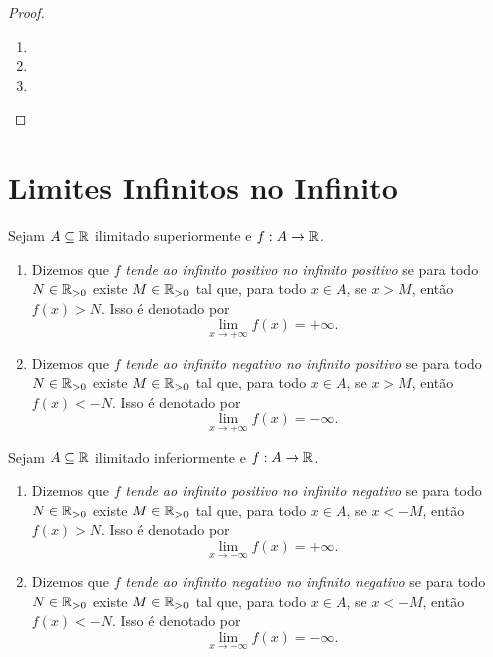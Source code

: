 \begin{proof}
    \leavevmode
        \begin{enumerate}[leftmargin=*, align=left, label=\textbf{(\alph*)}]
            \item \blackproof
            \item \blackproof
            \item \blackproof
        \end{enumerate}
\end{proof}

\section{Limites Infinitos no Infinito}

\begin{definition}
    Sejam $A \subseteq \mathbb{R}$ ilimitado superiormente e $f: A \to \mathbb{R}$.
        \begin{enumerate}[leftmargin=*, align=left, label=\textbf{(\alph*)}]
            \item Dizemos que $f$ \emph{tende ao infinito positivo no infinito positivo} se para todo $N \in \mathbb{R}_{>0}$ existe $M \in \mathbb{R}_{>0}$ tal que, para todo $x \in A$, se $x>M$, então $f(x)>N$. Isso é denotado por
                \[
                    \lim_{x \to +\infty} f(x) = +\infty.
                \]
            \item Dizemos que $f$ \emph{tende ao infinito negativo no infinito positivo} se para todo $N \in \mathbb{R}_{>0}$ existe $M \in \mathbb{R}_{>0}$ tal que, para todo $x \in A$, se $x>M$, então $f(x)<-N$. Isso é denotado por
                \[
                    \lim_{x \to +\infty} f(x) = -\infty.
                \]
        \end{enumerate}
\end{definition}

\begin{definition}
    Sejam $A \subseteq \mathbb{R}$ ilimitado inferiormente e $f: A \to \mathbb{R}$.
        \begin{enumerate}[leftmargin=*, align=left, label=\textbf{(\alph*)}]
            \item Dizemos que $f$ \emph{tende ao infinito positivo no infinito negativo} se para todo $N \in \mathbb{R}_{>0}$ existe $M \in \mathbb{R}_{>0}$ tal que, para todo $x \in A$, se $x<-M$, então $f(x)>N$. Isso é denotado por
                \[
                    \lim_{x \to -\infty} f(x) = +\infty.
                \]
            \item Dizemos que $f$ \emph{tende ao infinito negativo no infinito negativo} se para todo $N \in \mathbb{R}_{>0}$ existe $M \in \mathbb{R}_{>0}$ tal que, para todo $x \in A$, se $x<-M$, então $f(x)<-N$. Isso é denotado por
                \[
                    \lim_{x \to -\infty} f(x) = -\infty.
                \]
        \end{enumerate}
\end{definition}

